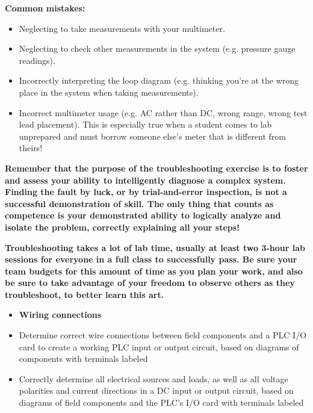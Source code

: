 \vskip 10pt

{\bf Common mistakes:}

\begin{itemize}
\item{} Neglecting to take measurements with your multimeter.
\item{} Neglecting to check other measurements in the system (e.g. pressure gauge readings).
\item{} Incorrectly interpreting the loop diagram (e.g. thinking you're at the wrong place in the system when taking measurements).
\item{} Incorrect multimeter usage (e.g. AC rather than DC, wrong range, wrong test lead placement).  This is especially true when a student comes to lab unprepared and must borrow someone else's meter that is different from theirs!
\end{itemize}

\vskip 10pt

{\bf Remember that the purpose of the troubleshooting exercise is to foster and assess your ability to intelligently diagnose a complex system.  Finding the fault by luck, or by trial-and-error inspection, is not a successful demonstration of skill.  The only thing that counts as competence is your demonstrated ability to logically analyze and isolate the problem, correctly explaining all your steps!}

\vskip 10pt

{\bf Troubleshooting takes a lot of lab time, usually at least two 3-hour lab sessions for everyone in a full class to successfully pass.  Be sure your team budgets for this amount of time as you plan your work, and also be sure to take advantage of your freedom to observe others as they troubleshoot, to better learn this art.}







\vfil \eject

\noindent
{} 

\begin{itemize}
\item{} {\bf Wiring connections}
\item{} Determine correct wire connections between field components and a PLC I/O card to create a working PLC input or output circuit, based on diagrams of components with terminals labeled
\item{} Correctly determine all electrical sources and loads, as well as all voltage polarities and current directions in a DC input or output circuit, based on diagrams of field components and the PLC's I/O card with terminals labeled
\end{itemize}

